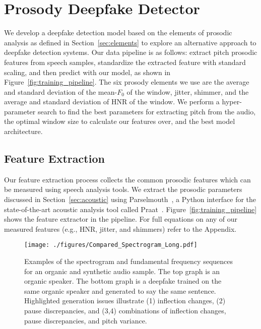 \documentclass[10pt, journal, anonymous=true]{IEEEtran}
\begin{document}
\section{Prosody Deepfake Detector} \label{sec:model}

We develop a deepfake detection model based on the elements of prosodic analysis as defined in Section~\ref{sec:elements} to explore an alternative approach to deepfake detection systems. Our data pipeline is as follows: extract pitch prosodic features from speech samples, standardize the extracted feature with standard scaling, and then predict with our model, as shown in Figure~\ref{fig:training_pipeline}. The six prosody elements we use are the average and standard deviation of the mean-$F_0$ of the window, jitter, shimmer, and the average and standard deviation of HNR of the window. We perform a hyper-parameter search to find the best parameters for extracting pitch from the audio, the optimal window size to calculate our features over, and the best model architecture.

\subsection{Feature Extraction}

Our feature extraction process collects the common prosodic features which can be measured using speech analysis tools. We extract the prosodic parameters discussed in Section~\ref{sec:acoustic} using Parselmouth~\cite{parselmouth}, a Python interface for the state-of-the-art acoustic analysis tool called Praat~\cite{praat}. Figure~\ref{fig:training_pipeline} shows the feature extractor in the pipeline. For full equations on any of our measured features (e.g., HNR, jitter, and shimmers) refer to the Appendix.

\begin{figure*}
    \begin{center}
        \texttt{[image: ./figures/Compared\_Spectrogram\_Long.pdf]}
        \caption{Examples of the spectrogram and fundamental frequency sequences for an organic 
        and synthetic audio sample. The top graph is an organic speaker. The bottom graph is a deepfake trained on the same organic speaker 
        and generated to say the same sentence. 
        Highlighted generation issues illustrate (1) inflection changes, (2) pause discrepancies, and 
        (3,4) combinations of inflection changes, pause discrepancies, and pitch variance.} 
        \label{fig:two_spectrograms}
    \end{center}
\end{figure*}
\end{document}
